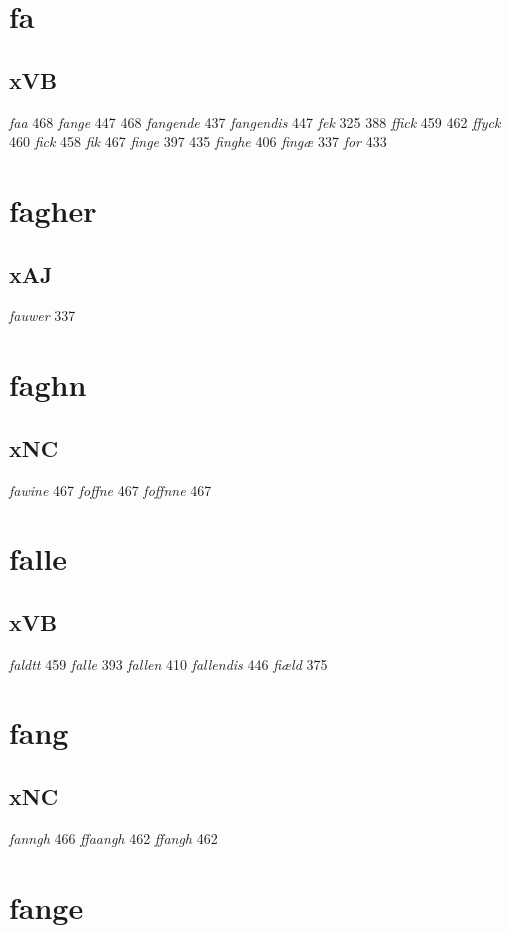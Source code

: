 \documentclass[a4paper,twocolumn]{article}
\begin{document}
\section{fa}
\label{sec:org0c64cc2}
\subsection{xVB}
\label{sec:org4f603a4}
\emph{faa} 468 \emph{fange} 447 468 \emph{fangende} 437 \emph{fangendis} 447 \emph{fek} 325 388 \emph{ffick} 459 462 \emph{ffyck} 460 \emph{fick} 458 \emph{fik} 467 \emph{finge} 397 435 \emph{finghe} 406 \emph{fingæ} 337 \emph{for} 433 
\section{fagher}
\label{sec:org6e8bbb9}
\subsection{xAJ}
\label{sec:org411839b}
\emph{fauwer} 337 
\section{faghn}
\label{sec:org9b3977f}
\subsection{xNC}
\label{sec:orgd6c6a93}
\emph{fawine} 467 \emph{foffne} 467 \emph{foffnne} 467 
\section{falle}
\label{sec:orgda99fbf}
\subsection{xVB}
\label{sec:org56a452b}
\emph{faldtt} 459 \emph{falle} 393 \emph{fallen} 410 \emph{fallendis} 446 \emph{fiæld} 375 
\section{fang}
\label{sec:org28b2f99}
\subsection{xNC}
\label{sec:org9eca4b0}
\emph{fanngh} 466 \emph{ffaangh} 462 \emph{ffangh} 462 
\section{fange}
\label{sec:org2c9cba3}
\end{document}
